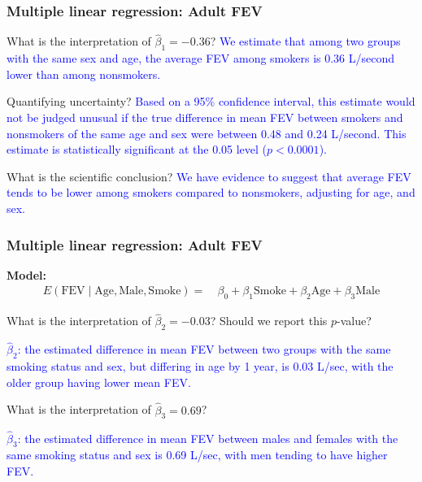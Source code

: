 \documentclass[12pt, 
hyperref={colorlinks=true, linkcolor=blue, urlcolor=cyan},dvipsnames]{beamer}
\begin{document}
\begin{frame}
\frametitle{Multiple linear regression: Adult FEV}

What is the interpretation of $\hat{\beta}_1 = -0.36$? \pause \textcolor{blue}{We estimate that among two groups with the same sex and age, the average FEV among smokers is 0.36 L/second lower than among nonsmokers.}

Quantifying uncertainty? \pause \textcolor{blue}{Based on a 95\% confidence interval, this estimate would not be judged unusual if the true difference in mean FEV between smokers and nonsmokers of the same age and sex were between 0.48 and 0.24 L/second. This estimate is statistically significant at the 0.05 level ($p < 0.0001$).}

What is the scientific conclusion? \pause \textcolor{blue}{We have evidence to suggest that average FEV tends to be lower among smokers compared to nonsmokers, adjusting for age, and sex.}
\end{frame}

\begin{frame}
\frametitle{Multiple linear regression: Adult FEV}
\vspace{-0.5cm}\textbf{Model:} {\small \begin{align*}
E(\text{FEV} \mid \text{Age}, \text{Male}, \text{Smoke}) =& \ \beta_0 + \beta_1 \text{Smoke} + \beta_2 \text{Age} + \beta_3 \text{Male} 
\end{align*} } \vspace{-1cm}

What is the interpretation of $\hat{\beta}_2 = -0.03$? Should we report this $p$-value? \pause

\textcolor{blue}{$\hat{\beta}_2$: the estimated difference in mean FEV between two groups with the same smoking status and sex, but differing in age by 1 year, is 0.03 L/sec, with the older group having lower mean FEV.}

What is the interpretation of $\hat{\beta}_3 = 0.69$? \pause

\textcolor{blue}{$\hat{\beta}_3$: the estimated difference in mean FEV between males and females with the same smoking status and sex is 0.69 L/sec, with men tending to have higher FEV.}

\end{frame}
\end{document}

